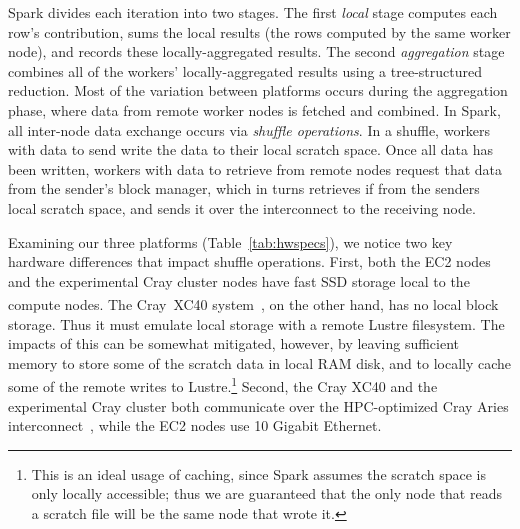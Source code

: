 Spark divides each iteration into two stages.  The first \emph{local} stage computes each row's contribution, sums the local results (the rows computed by the same worker node), and records these locally-aggregated results.  The second \emph{aggregation} stage combines all of the workers' locally-aggregated results using a tree-structured reduction.  Most of the variation between platforms occurs during the aggregation phase, where data from remote worker nodes is fetched and combined.  In Spark, all inter-node data exchange occurs via \emph{shuffle operations}.  In a shuffle, workers with data to send write the data to their local scratch space.  Once all data has been written, workers with data to retrieve from remote nodes request that data from the sender's block manager, which in turns retrieves if from the senders local scratch space, and sends it over the interconnect to the receiving node.

Examining our three platforms (Table~\ref{tab:hwspecs}), we notice two key hardware differences that impact shuffle operations.  First, both the EC2 nodes and the experimental Cray cluster nodes have fast SSD storage local to the compute nodes.  The Cray\textregistered~XC40\textsuperscript{\tiny\texttrademark} system~\cite{alverson2012cray,craycascadesc12}, on the other hand, has no local block storage.  Thus it must emulate local storage with a remote Lustre filesystem.  The impacts of this can be somewhat mitigated, however, by leaving sufficient memory to store some of the scratch data in local RAM disk, and to locally cache some of the remote writes to Lustre.\footnote{This is an ideal usage of caching, since Spark assumes the scratch space is only locally accessible; thus we are guaranteed that the only node that reads a scratch file will be the same node that wrote it.}  Second, the Cray XC40 and the experimental Cray cluster both communicate over the HPC-optimized Cray Aries 
interconnect~\cite{alverson2012cray,craycascadesc12}, while the EC2 nodes use 10 Gigabit Ethernet.  

